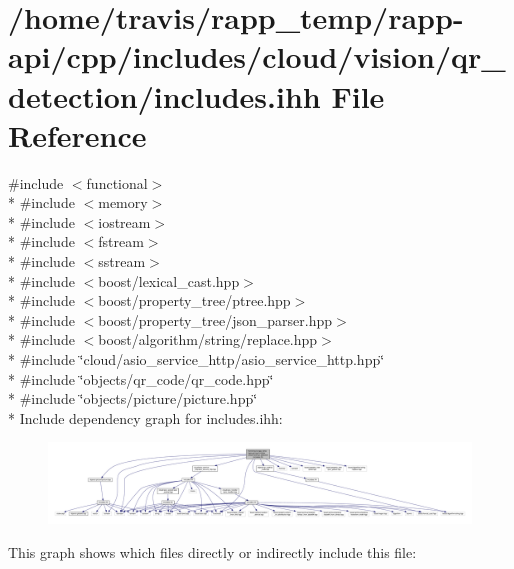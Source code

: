 \hypertarget{cloud_2vision_2qr__detection_2includes_8ihh}{\section{/home/travis/rapp\-\_\-temp/rapp-\/api/cpp/includes/cloud/vision/qr\-\_\-detection/includes.ihh File Reference}
\label{cloud_2vision_2qr__detection_2includes_8ihh}
}
{\ttfamily \#include $<$functional$>$}\\*
{\ttfamily \#include $<$memory$>$}\\*
{\ttfamily \#include $<$iostream$>$}\\*
{\ttfamily \#include $<$fstream$>$}\\*
{\ttfamily \#include $<$sstream$>$}\\*
{\ttfamily \#include $<$boost/lexical\-\_\-cast.\-hpp$>$}\\*
{\ttfamily \#include $<$boost/property\-\_\-tree/ptree.\-hpp$>$}\\*
{\ttfamily \#include $<$boost/property\-\_\-tree/json\-\_\-parser.\-hpp$>$}\\*
{\ttfamily \#include $<$boost/algorithm/string/replace.\-hpp$>$}\\*
{\ttfamily \#include \char`\"{}cloud/asio\-\_\-service\-\_\-http/asio\-\_\-service\-\_\-http.\-hpp\char`\"{}}\\*
{\ttfamily \#include \char`\"{}objects/qr\-\_\-code/qr\-\_\-code.\-hpp\char`\"{}}\\*
{\ttfamily \#include \char`\"{}objects/picture/picture.\-hpp\char`\"{}}\\*
Include dependency graph for includes.\-ihh\-:
\nopagebreak
\begin{figure}[H]
\begin{center}
\leavevmode
\includegraphics[width=350pt]{cloud_2vision_2qr__detection_2includes_8ihh__incl}
\end{center}
\end{figure}
This graph shows which files directly or indirectly include this file\-:
\nopagebreak
